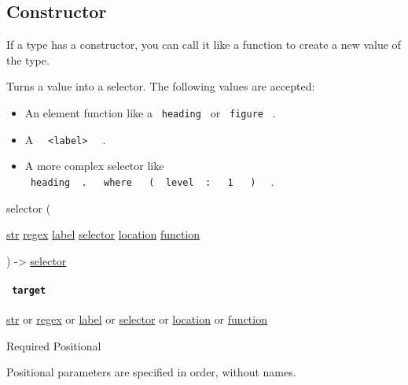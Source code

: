 \subsection{\texorpdfstring{Constructor
{}}{Constructor }}\label{constructor}

\label{constructor-constructor-tooltip}
If a type has a constructor, you can call it like a function to create a
new value of the type.

Turns a value into a selector. The following values are accepted:

\begin{itemize}
\tightlist
\item
  An element function like a \texttt{\ heading\ } or \texttt{\ figure\ }
  .
\item
  A \texttt{\ }{\texttt{\ \textless{}label\textgreater{}\ }}\texttt{\ }
  .
\item
  A more complex selector like
  \texttt{\ heading\ }{\texttt{\ .\ }}\texttt{\ }{\texttt{\ where\ }}\texttt{\ }{\texttt{\ (\ }}\texttt{\ level\ }{\texttt{\ :\ }}\texttt{\ }{\texttt{\ 1\ }}\texttt{\ }{\texttt{\ )\ }}\texttt{\ }
  .
\end{itemize}

{ selector } (

{ \href{/docs/reference/foundations/str/}{str}
\href{/docs/reference/foundations/regex/}{regex}
\href{/docs/reference/foundations/label/}{label}
\href{/docs/reference/foundations/selector/}{selector}
\href{/docs/reference/introspection/location/}{location}
\href{/docs/reference/foundations/function/}{function} }

) -\textgreater{} \href{/docs/reference/foundations/selector/}{selector}

\paragraph{\texorpdfstring{\texttt{\ target\ }}{ target }}\label{constructor-target}

\href{/docs/reference/foundations/str/}{str} {or}
\href{/docs/reference/foundations/regex/}{regex} {or}
\href{/docs/reference/foundations/label/}{label} {or}
\href{/docs/reference/foundations/selector/}{selector} {or}
\href{/docs/reference/introspection/location/}{location} {or}
\href{/docs/reference/foundations/function/}{function}

{Required} {{ Positional }}

\label{constructor-target-positional-tooltip}
Positional parameters are specified in order, without names.

